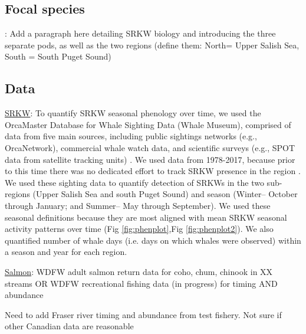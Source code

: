 \documentclass{article}
\begin{document}
\subsection*{Focal species}:
Add a paragraph here detailing SRKW biology and introducing the three separate pods, as well as the two regions (define them: North= Upper Salish Sea, South = South Puget Sound)

\subsection* {Data}

\par \underline{SRKW}: To quantify SRKW seasonal phenology over time, we used the OrcaMaster Database for Whale Sighting Data (Whale Museum), comprised of data from five main sources, including public sightings networks (e.g., OrcaNetwork), commercial whale watch data, and scientific surveys (e.g., SPOT data from satellite tracking units) \citep{olson2018}. We used data from 1978-2017, because prior to this time there was no dedicated effort to track SRKW presence in the region \citep{olson2018}. We used these sighting data to quantify %
detection of SRKWs in the two sub-regions (Upper Salish Sea and south Puget Sound) and season (Winter-- October through January; and Summer-- May through September). We used these seasonal definitions because they are most aligned with mean SRKW seasonal activity patterns over time (Fig \ref{fig:phenplot},Fig \ref{fig:phenplot2}).  We also quantified number of whale days (i.e. days on which whales were observed) within a season and year for each region. 

\par \underline{Salmon}:  WDFW adult salmon return data for coho, chum, chinook in XX streams OR WDFW recreational fishing data (in progress) for timing AND abundance
\par Need to add Fraser river timing and abundance from test fishery. Not sure if other Canadian data are reasonable
\end{document}
